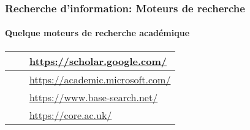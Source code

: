 \documentclass[xcolor=table]{beamer}
\begin{document}
\begin{frame}
\frametitle{Recherche d'information: Moteurs de recherche}
\framesubtitle{Quelque moteurs de recherche académique}

\def\arraystretch{0}
\begin{tabular}{L{.3\textwidth}{1cm}cp{.6\textwidth}}%
	
	\hline
	
	 &
	&
	\url{https://scholar.google.com/} \\
	
	\hline
	
	 &
	& 
	\url{https://academic.microsoft.com/}  \\
	
	\hline
	
	 &
	& 
	\url{https://www.base-search.net/} \\
	
	\hline
	
	 & 
	& 
	\url{https://core.ac.uk/} \\
	
	\hline
	
\end{tabular}


\end{frame}
\end{document}
